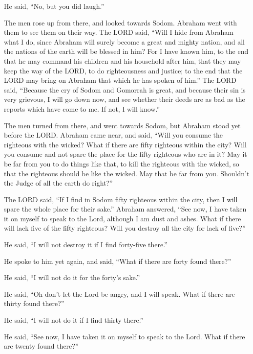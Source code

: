 He said, ``No, but you did laugh.''

 The men rose up from there, and looked towards Sodom.
Abraham went with them to see them on their way.  The LORD
said, ``Will I hide from Abraham what I do,  since Abraham
will surely become a great and mighty nation, and all the nations of the
earth will be blessed in him?  For I have known him, to the
end that he may command his children and his household after him, that
they may keep the way of the LORD, to do righteousness and justice; to
the end that the LORD may bring on Abraham that which he has spoken of
him.''  The LORD said, ``Because the cry of Sodom and
Gomorrah is great, and because their sin is very grievous, 
I will go down now, and see whether their deeds are as bad as the
reports which have come to me. If not, I will know.''

 The men turned from there, and went towards Sodom, but
Abraham stood yet before the LORD.  Abraham came near, and
said, ``Will you consume the righteous with the wicked? 
What if there are fifty righteous within the city? Will you consume and
not spare the place for the fifty righteous who are in it? 
May it be far from you to do things like that, to kill the righteous
with the wicked, so that the righteous should be like the wicked. May
that be far from you. Shouldn't the Judge of all the earth do right?''

 The LORD said, ``If I find in Sodom fifty righteous within
the city, then I will spare the whole place for their sake.''
 Abraham answered, ``See now, I have taken it on myself to
speak to the Lord, although I am dust and ashes.  What if
there will lack five of the fifty righteous? Will you destroy all the
city for lack of five?''

He said, ``I will not destroy it if I find forty-five there.''

 He spoke to him yet again, and said, ``What if there are
forty found there?''

He said, ``I will not do it for the forty's sake.''

 He said, ``Oh don't let the Lord be angry, and I will
speak. What if there are thirty found there?''

He said, ``I will not do it if I find thirty there.''

 He said, ``See now, I have taken it on myself to speak to
the Lord. What if there are twenty found there?''

